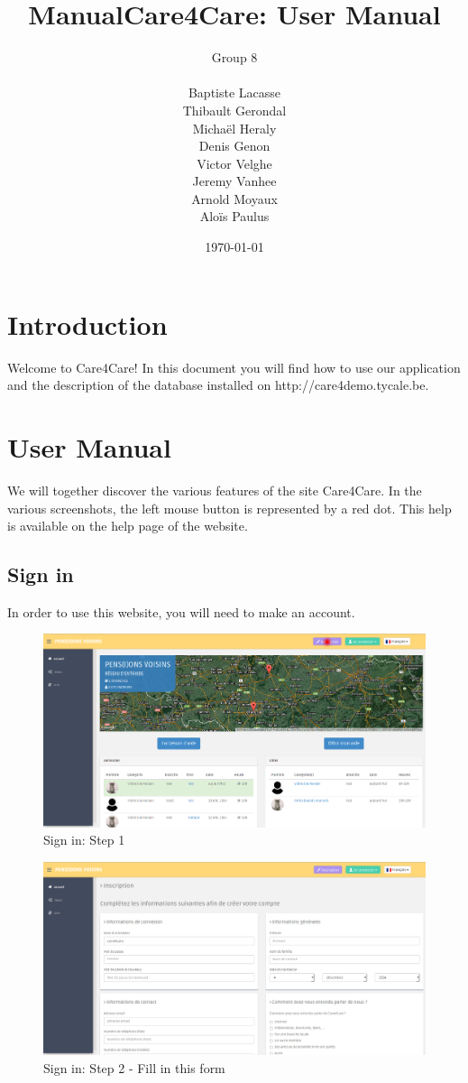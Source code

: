 \documentclass{article}
\title{Manual}
\title{Care4Care: User Manual}
\author{Group 8 \\ 
\\
Baptiste Lacasse \\
Thibault Gerondal \\
Michaël Heraly \\
Denis Genon \\
Victor Velghe \\
Jeremy Vanhee \\
Arnold Moyaux \\
Aloïs Paulus}
\date{\today}
\begin{document}
\maketitle

\tableofcontents


\section{Introduction}
Welcome to Care4Care! In this document you will find how to use our application and the description of the database installed on http://care4demo.tycale.be.
 \section{User Manual}
 We will together discover the various features of the site Care4Care. In the various screenshots, the left mouse button is represented by a red dot. This help is available on the help page of the website.
\subsection{Sign in}
In order to use this website, you will need to make an account.
\begin{figure}[!ht]
   \includegraphics[width=\textwidth]{img/inscr1.png}
   \caption{Sign in: Step 1}
\end{figure}

\begin{figure}[!ht]
   \includegraphics[width=\textwidth]{img/inscr2.png}
   \caption{Sign in: Step 2 - Fill in this form}
\end{figure}
\end{document}
